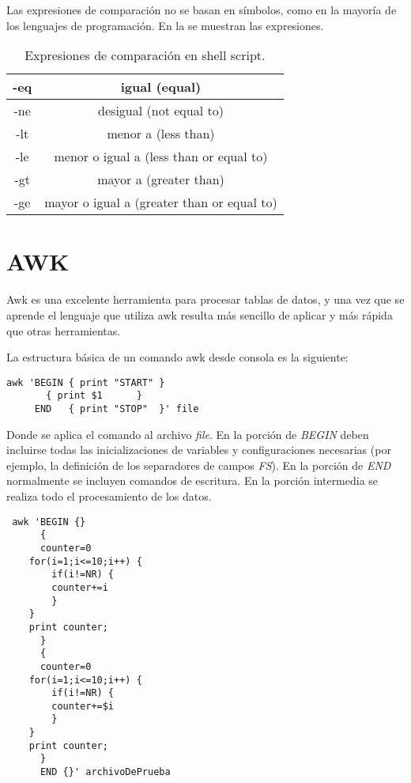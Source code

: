 Las expresiones de comparación no se basan en símbolos, como en la mayoría de los lenguajes de programación. En la 
se muestran las expresiones.
\begin{table}[htp]
\begin{center}
\begin{tabular}{*{2}{c}}
\hline
-eq&	igual (equal)\\ \hline
-ne&	desigual (not equal to)\\ \hline
-lt&	menor a (less than)\\ \hline
-le&	menor o igual a (less than or equal to)\\ \hline
-gt&	mayor a (greater than)\\ \hline
-ge&	mayor o igual a (greater than or equal to)\\ \hline
\end{tabular}
\end{center}
\caption[Expresiones de comparación en shell script]{Expresiones de comparación en shell script.}
\label{AC:tbl:comp}
\end{table}

\section{AWK}

Awk es una excelente herramienta para procesar tablas de datos, y una vez que se aprende el lenguaje que utiliza awk resulta más sencillo de aplicar y más rápida que otras herramientas.

La estructura básica de un comando awk desde consola es la siguiente:
\begin{lstlisting}
awk 'BEGIN { print "START" }
	   { print $1      }
     END   { print "STOP"  }' file
\end{lstlisting}

Donde se aplica el comando al archivo \textit{file}. En la porción de \textit{BEGIN} deben incluirse todas las inicializaciones de variables y configuraciones necesarias (por ejemplo, la definición de los separadores de campos \textit{FS}). En la porción de \textit{END} normalmente se incluyen comandos de escritura. En la porción intermedia se realiza todo el procesamiento de los datos.
\begin{lstlisting}
 awk 'BEGIN {}
      {
      counter=0
	for(i=1;i<=10;i++) {
	    if(i!=NR) {
		counter+=i
	    }
	}
	print counter;
      } 
      {
      counter=0
	for(i=1;i<=10;i++) {
	    if(i!=NR) {
		counter+=$i
	    }
	}
	print counter;
      }
      END {}' archivoDePrueba
\end{lstlisting}

